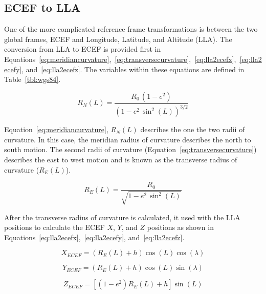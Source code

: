 \subsection{\textbf{ECEF to LLA}}

One of the more complicated reference frame transformations is between the two global frames, ECEF and Longitude, Latitude, and Altitude (LLA). The conversion from LLA to ECEF is provided first in Equations~\ref{eq:meridiancurvature},~\ref{eq:transversecurvature},~\ref{eq:lla2ecefx},~\ref{eq:lla2ecefy}, and~\ref{eq:lla2ecefz}. The variables within these equations are defined in Table~\ref{tbl:wgs84}.

\begin{equation}\label{eq:meridiancurvature}
    R_N (L) = \frac{R_0 \, \left(1 - e^2\right)}{{\left(1 - e^2 \, \sin^2 {\left(L\right)}\right)}^{3/2}}
\end{equation}

Equation~\ref{eq:meridiancurvature}, \(R_N (L)\) describes the one the two radii of curvature. In this case, the meridian radius of curvature describes the north to south motion. The second radii of curvature (Equation~\ref{eq:transversecurvature}) describes the east to west motion and is known as the transverse radius of curvature (\(R_E (L) \)).

\begin{equation}\label{eq:transversecurvature}
    R_E (L) = \frac{R_0}{\sqrt{1 - e^2 \, \sin^2 {\left(L\right)}}}
\end{equation}

After the transverse radius of curvature is calculated, it used with the LLA positions to calculate the ECEF \(X\), \(Y\), and \(Z\) positions as shown in Equations~\ref{eq:lla2ecefx},~\ref{eq:lla2ecefy}, and~\ref{eq:lla2ecefz}.

\begin{equation}\label{eq:lla2ecefx}
    X_{ECEF} = \left(R_E (L) + h\right)\cos \left(L\right)\cos \left(\lambda\right)
\end{equation}

\begin{equation}\label{eq:lla2ecefy}
    Y_{ECEF} = \left(R_E (L) + h\right)\cos \left(L\right)\sin \left(\lambda\right)
\end{equation}

\begin{equation}\label{eq:lla2ecefz}
    Z_{ECEF} = \left[\left(1 - e^2\right) R_E (L) + h\right] \sin \left(L\right)
\end{equation}

